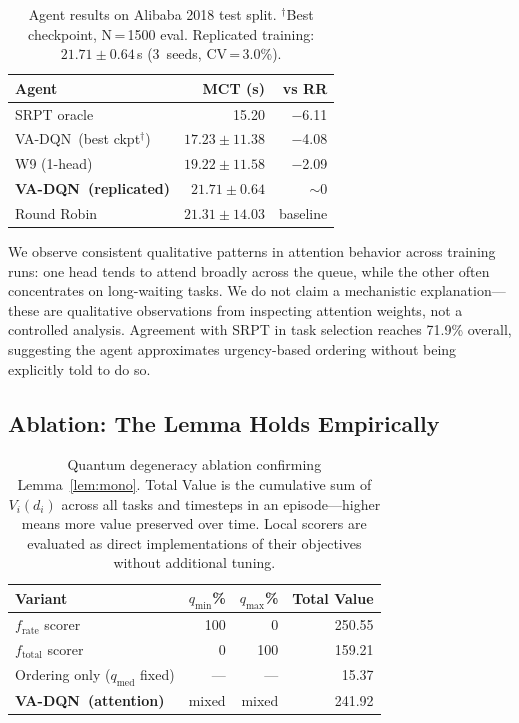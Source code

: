 \documentclass[10pt,twocolumn]{article}
\theoremstyle{remark}
\newcommand{\vadqn}{VA-DQN}
\begin{document}
\begin{table}[h]
\centering
\caption{Agent results on Alibaba 2018 test split.
$^\dagger$Best checkpoint, N\,=\,1500 eval.
Replicated training: $21.71\pm0.64$\,s (3~seeds, CV\,=\,3.0\%).}
\label{tab:main}
\small
\begin{tabular}{lrr}
\toprule
Agent & MCT (s) & vs RR \\
\midrule
SRPT oracle & 15.20 & $-$6.11 \\
\vadqn\ (best ckpt$^\dagger$) & $17.23\pm11.38$ & $-$4.08 \\
W9 (1-head) & $19.22\pm11.58$ & $-$2.09 \\
\textbf{\vadqn\ (replicated)} & $\mathbf{21.71\pm0.64}$ & $\sim$0 \\
Round Robin & $21.31\pm14.03$ & baseline \\
\bottomrule
\end{tabular}
\end{table}

We observe consistent qualitative patterns in attention behavior
across training runs: one head tends to attend broadly across the
queue, while the other often concentrates on long-waiting tasks. We
do not claim a mechanistic explanation---these are qualitative
observations from inspecting attention weights, not a controlled
analysis. Agreement with SRPT in task selection reaches 71.9\%
overall, suggesting the agent approximates urgency-based ordering
without being explicitly told to do so.

\subsection{Ablation: The Lemma Holds Empirically}
\label{sec:theory-confirms}

\begin{table}[h]
\centering
\caption{Quantum degeneracy ablation confirming Lemma~\ref{lem:mono}.
Total Value is the cumulative sum of $V_i(d_i)$ across all tasks and
timesteps in an episode---higher means more value preserved over
time. Local scorers are evaluated as direct implementations of their
objectives without additional tuning.}
\label{tab:abl}
\small
\begin{tabular}{lrrr}
\toprule
Variant & $q_{\min}$\% & $q_{\max}$\% & Total Value \\
\midrule
$f_{\mathrm{rate}}$ scorer & 100 & 0 & 250.55 \\
$f_{\mathrm{total}}$ scorer & 0 & 100 & 159.21 \\
Ordering only ($q_{\mathrm{med}}$ fixed) & --- & --- & 15.37 \\
\textbf{\vadqn\ (attention)} & mixed & mixed & 241.92 \\
\bottomrule
\end{tabular}
\end{table}
\end{document}
